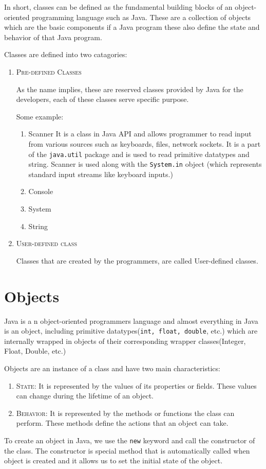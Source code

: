 \documentclass[a4paper, 12pt]{scrarticle}
\begin{document}
In short, classes can be defined as the fundamental building blocks of an object-oriented programming language such as Java. These are a collection of objects which are the basic components if a Java program these also define the state and behavior of that Java program.

Classes are defined into two catagories:

\begin{enumerate}
  \item \textsc{Pre-defined Classes}

    As the name implies, these are reserved classes provided by Java for the developers, each of these classes serve specific purpose.

    Some example:
    \begin{enumerate}
      \item Scanner
        It is a class in Java API and allows programmer to read input from various sources such as keyboards, files, network sockets. It is a part of the \verb+java.util+ package and is used to read primitive datatypes and string. Scanner is used along with the \verb+System.in+
        object (which represents standard input streams like keyboard inputs.)
      \item Console
      \item System
      \item String
    \end{enumerate}

  \item \textsc{User-defined class}

    Classes that are created by the programmers, are called User-defined classes.
\end{enumerate}

\section{Objects}
Java is a n object-oriented programmers language and almost everything in Java is an object, including primitive datatypes(\verb+int, float, double+, etc.) which are internally wrapped in objects of their corresponding wrapper classes(Integer, Float, Double, etc.)

Objects are an instance of a class and have two main characteristics:
\begin{enumerate}
  \item \textsc{State:} It is represented by the values of its properties or fields. These values can change during the lifetime of an object.

  \item \textsc{Behavior:} It is represented by the methods or functions the class can perform. These methods define the actions that an object can take.
\end{enumerate}
To create an object in Java, we use the \verb+new+ keyword and call the constructor of the class. The constructor is special method that is automatically called when object is created and it allows us to set the initial state of the object.
\end{document}
